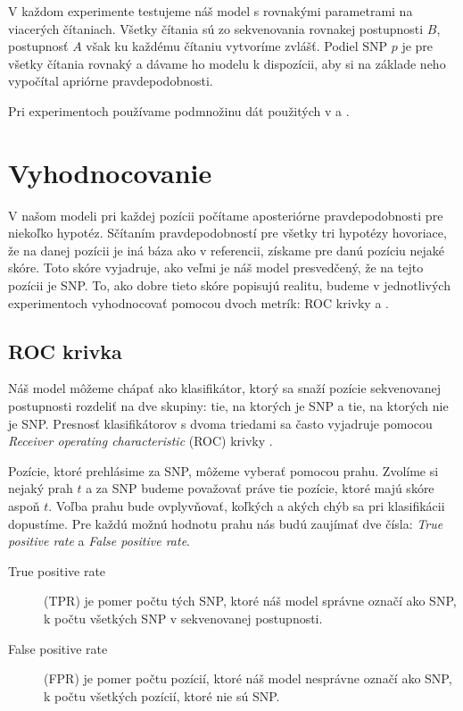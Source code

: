 V každom experimente testujeme náš model s rovnakými parametrami na viacerých čítaniach. Všetky čítania
sú zo sekvenovania rovnakej postupnosti $B$, postupnosť $A$ však ku každému čítaniu vytvoríme zvlášť.
Podiel SNP $p$ je pre všetky čítania rovnaký a dávame ho modelu k dispozícii, aby si na základe
neho vypočítal apriórne pravdepodobnosti.

Pri experimentoch používame podmnožinu dát použitých v \cite{BasecallerComparison} a .

\section{Vyhodnocovanie}

V našom modeli pri každej pozícii počítame aposteriórne pravdepodobnosti pre niekoľko hypotéz. Sčítaním
pravdepodobností pre všetky tri hypotézy hovoriace, že na danej pozícii je iná báza ako v referencii,
získame pre danú pozíciu nejaké skóre. Toto skóre vyjadruje, ako veľmi je náš model presvedčený, že na tejto pozícii je SNP. To, ako dobre tieto skóre popisujú realitu, budeme v jednotlivých experimentoch vyhodnocovať pomocou dvoch metrík: ROC krivky a \todo{}.

\subsection{ROC krivka}

Náš model môžeme chápať ako klasifikátor, ktorý sa snaží pozície sekvenovanej postupnosti rozdeliť
na dve skupiny: tie, na ktorých je SNP a tie, na ktorých nie je SNP.
Presnosť klasifikátorov s dvoma triedami sa často vyjadruje pomocou \emph{Receiver operating characteristic} (ROC) krivky .

Pozície, ktoré prehlásime za SNP, môžeme vyberať pomocou prahu. Zvolíme si nejaký prah $t$ a za
SNP budeme považovať práve tie pozície, ktoré majú skóre aspoň $t$. Voľba prahu bude ovplyvňovať,
koľkých a akých chýb sa pri klasifikácii dopustíme.
Pre každú možnú hodnotu prahu nás budú zaujímať dve čísla: \emph{True positive rate} a \emph{False positive rate}. 

\begin{definicia} 
\leavevmode
\begin{description}
\item[True positive rate] (TPR) je pomer počtu tých SNP, ktoré náš model správne označí ako SNP, k počtu všetkých SNP v sekvenovanej postupnosti.
\item[False positive rate] (FPR) je pomer počtu
pozícií, ktoré náš model nesprávne označí ako SNP, k počtu všetkých pozícií, ktoré nie sú SNP.
\end{description}
\end{definicia}

